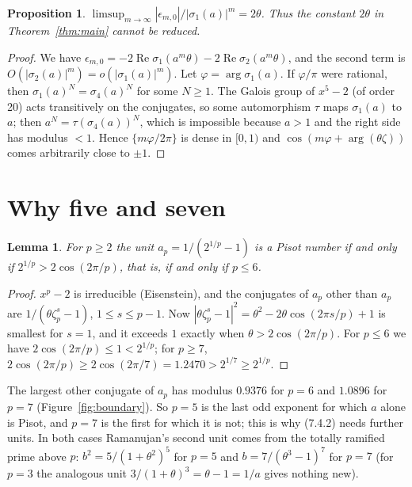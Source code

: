\documentclass[11pt]{article}
\newtheorem{proposition}[theorem]{Proposition}
\newtheorem{lemma}[theorem]{Lemma}
\theoremstyle{remark}
\begin{document}
\begin{proposition}\label{prop:sharp}
$\limsup_{m\to\infty}|\epsilon_{m,0}|/|\sigma_1(a)|^m=2\theta$. Thus the constant $2\theta$ in Theorem~\ref{thm:main} cannot be reduced.
\end{proposition}

\begin{proof}
We have $\epsilon_{m,0}=-2\operatorname{Re}\sigma_1(a^m\theta)-2\operatorname{Re}\sigma_2(a^m\theta)$, and the second term is
$O(|\sigma_2(a)|^m)=o(|\sigma_1(a)|^m)$. Let $\varphi=\arg\sigma_1(a)$. If $\varphi/\pi$ were rational, then $\sigma_1(a)^N=\sigma_4(a)^N$ for
some $N\ge1$. The Galois group of $x^5-2$ (of order 20) acts transitively on the conjugates, so some automorphism $\tau$ maps $\sigma_1(a)$
to $a$; then $a^N=\tau(\sigma_4(a))^N$, which is impossible because $a>1$ and the right side has modulus $<1$. Hence
$\{m\varphi/2\pi\}$ is dense in $[0,1)$ and $\cos(m\varphi+\arg(\theta\zeta))$ comes arbitrarily close to $\pm1$.
\end{proof}

\section{Why five and seven}\label{sec:why}
\begin{lemma}\label{lem:pisot}
For $p\ge2$ the unit $a_p=1/(2^{1/p}-1)$ is a Pisot number if and only if $2^{1/p}>2\cos(2\pi/p)$, that is, if and only if $p\le6$.
\end{lemma}

\begin{proof}
$x^p-2$ is irreducible (Eisenstein), and the conjugates of $a_p$ other than $a_p$ are $1/(\theta\zeta_p^s-1)$, $1\le s\le p-1$. Now
$|\theta\zeta_p^s-1|^2=\theta^2-2\theta\cos(2\pi s/p)+1$ is smallest for $s=1$, and it exceeds $1$ exactly when $\theta>2\cos(2\pi/p)$. For
$p\le6$ we have $2\cos(2\pi/p)\le1<2^{1/p}$; for $p\ge7$, $2\cos(2\pi/p)\ge2\cos(2\pi/7)=1.2470>2^{1/7}\ge2^{1/p}$.
\end{proof}

The largest other conjugate of $a_p$ has modulus $0.9376$ for $p=6$ and $1.0896$ for $p=7$ (Figure~\ref{fig:boundary}). So $p=5$ is the
last odd exponent for which $a$ alone is Pisot, and $p=7$ is the first for which it is not; this is why (7.4.2) needs further units.
In both cases Ramanujan's second unit comes from the totally ramified prime above $p$: $b^2=5/(1+\theta^2)^5$ for $p=5$ and
$b=7/(\theta^3-1)^7$ for $p=7$ (for $p=3$ the analogous unit $3/(1+\theta)^3=\theta-1=1/a$ gives nothing new).
\end{document}
